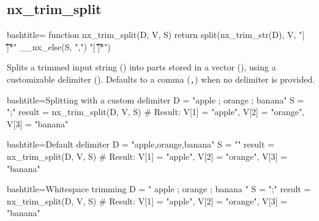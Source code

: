 \newpage
\subsection{nx_trim_split}
\label{nx_trim_split}
\begin{NexCodeBox}{bash}{title={}}
	function nx_trim_split(D, V, S) {
		return split(nx_trim_str(D), V, "[ \v\t\n\f]*" __nx_else(S, ",") "[ \v\t\n\f]*")
	}
\end{NexCodeBox}

\begin{NexMainBox}
	\begin{NexMainBox}
		Splits a trimmed input string () into parts stored in a vector (), using a customizable delimiter (). Defaults to a comma (\texttt{,}) when no delimiter is provided.
	\end{NexMainBox}
	\begin{NexMainBox}
		\begin{NexListDark}
		\end{NexListDark}
	\end{NexMainBox}
\end{NexMainBox}

\begin{NexCodeBox}{bash}{title={Splitting with a custom delimiter}}
	D = "apple ; orange ; banana"
	S = ";"
	result = nx_trim_split(D, V, S)
	# Result: V[1] = "apple", V[2] = "orange", V[3] = "banana"
\end{NexCodeBox}

\begin{NexCodeBox}{bash}{title={Default delimiter}}
	D = "apple,orange,banana"
	S = ""
	result = nx_trim_split(D, V, S)
	# Result: V[1] = "apple", V[2] = "orange", V[3] = "banana"
\end{NexCodeBox}

\begin{NexCodeBox}{bash}{title={Whitespace trimming}}
	D = "  apple  ; orange ;   banana   "
	S = ";"
	result = nx_trim_split(D, V, S)
	# Result: V[1] = "apple", V[2] = "orange", V[3] = "banana"
\end{NexCodeBox}

